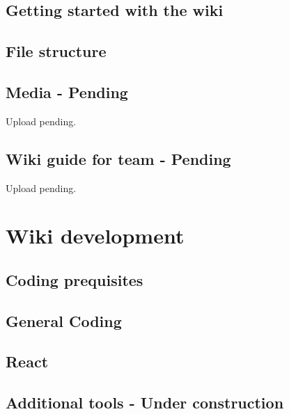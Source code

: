 \documentclass[a4paper, 11pt, twoside]{book}
\begin{document}
\chapter{Getting started with the wiki} \label{ch:started}

\newpage
\chapter{File structure} \label{ch:structure}

\newpage
%
\chapter{Media  - Pending}\label{ch:media}
Upload pending. %
%
\newpage
%
%
\chapter{Wiki guide for team - Pending} \label{ch:guide}
Upload pending. %
%
\newpage

\part{Wiki development}\label{part:wiki-development}


\chapter{Coding prequisites} \label{ch:prequisites}

\newpage
%
\chapter{General Coding}  \label{ch:coding}

\newpage
%
\chapter{React} \label{ch:react}


\newpage
%
\chapter{Additional tools - Under construction} \label{ch:addtools}

\newpage
%
\end{document}
